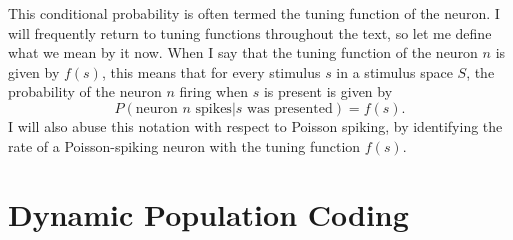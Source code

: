 This conditional probability is often termed the tuning function of the neuron. I will frequently return to tuning functions throughout the text, so let me define what we mean by it now. When I say that the tuning function of the neuron $n$ is given by $f(s)$, this means that for every stimulus $s$ in a stimulus space $S$, the probability of the neuron $n$ firing when $s$ is present is given by
$$
P(\textrm{neuron $n$ spikes}|s\textrm{ was presented}) = f(s).
$$
I will also abuse this notation with respect to Poisson spiking, by identifying the rate of a Poisson-spiking neuron with the tuning function $f(s)$.
\section{Dynamic Population Coding}


